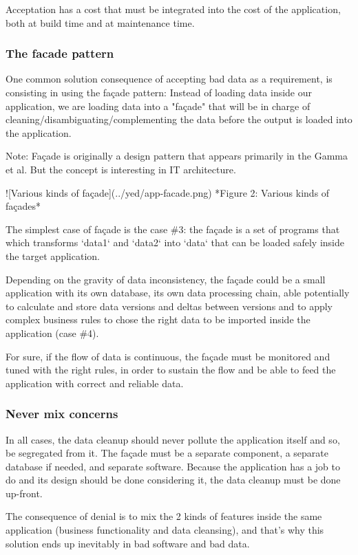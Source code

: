 \documentclass[]{article}
\begin{document}
Acceptation has a cost that must be integrated into the cost of the application, both at build time and at maintenance time.

\subsubsection{The facade pattern}

One common solution consequence of accepting bad data as a requirement, is consisting in using the façade pattern: Instead of loading data inside our application, we are loading data into a "façade" that will be in charge of cleaning/disambiguating/complementing the data before the output is loaded into the application.

Note: Façade is originally a design pattern that appears primarily in the Gamma et al. But the concept is interesting in IT architecture.

![Various kinds of façade](../yed/app-facade.png)
*Figure 2: Various kinds of façades*

The simplest case of façade is the case \#3: the façade is a set of programs that which transforms `data1` and `data2` into `data` that can be loaded safely inside the target application.

Depending on the gravity of data inconsistency, the façade could be a small application with its own database, its own data processing chain, able potentially to calculate and store data versions and deltas between versions and to apply complex business rules to chose the right data to be imported inside the application (case \#4).

For sure, if the flow of data is continuous, the façade must be monitored and tuned with the right rules, in order to sustain the flow and be able to feed the application with correct and reliable data.

\subsubsection{Never mix concerns}

In all cases, the data cleanup should never pollute the application itself and so, be segregated from it. The façade must be a separate component, a separate database if needed, and separate software. Because the application has a job to do and its design should be done considering it, the data cleanup must be done up-front.

The consequence of denial is to mix the 2 kinds of features inside the same application (business functionality and data cleansing), and that's why this solution ends up inevitably in bad software and bad data.
\end{document}
